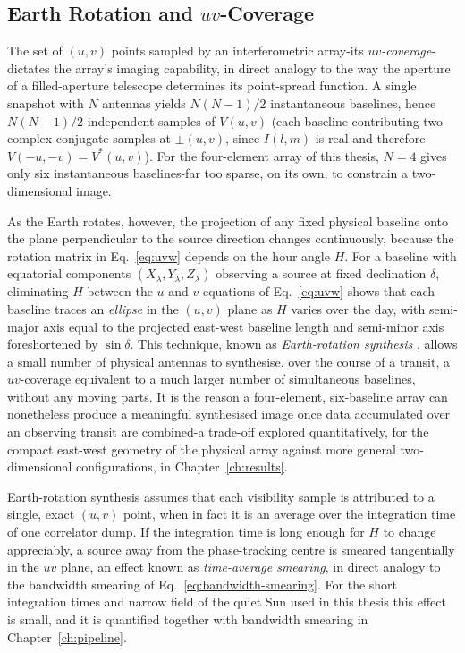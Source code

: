 \subsection{Earth Rotation and \texorpdfstring{$uv$}{uv}-Coverage}
\label{subsec:earth-rotation-uv}
The set of $(u,v)$ points sampled by an interferometric array-its
\emph{$uv$-coverage}-dictates the array's imaging capability, in direct
analogy to the way the aperture of a filled-aperture telescope determines its
point-spread function. A single snapshot with $N$ antennas yields $N(N-1)/2$
instantaneous baselines, hence $N(N-1)/2$ independent samples of $V(u,v)$
(each baseline contributing two complex-conjugate samples at $\pm(u,v)$, since
$I(l,m)$ is real and therefore $V(-u,-v)=V^{*}(u,v)$). For the four-element
array of this thesis, $N=4$ gives only six instantaneous baselines-far too
sparse, on its own, to constrain a two-dimensional image.

As the Earth rotates, however, the projection of any fixed physical baseline
onto the plane perpendicular to the source direction changes continuously,
because the rotation matrix in Eq.~\eqref{eq:uvw} depends on the hour angle
$H$. For a baseline with equatorial components $(X_\lambda,Y_\lambda,Z_\lambda)$
observing a source at fixed declination $\delta$, eliminating $H$ between the
$u$ and $v$ equations of Eq.~\eqref{eq:uvw} shows that each baseline traces an
\emph{ellipse} in the $(u,v)$ plane as $H$ varies over the day, with
semi-major axis equal to the projected east-west baseline length and
semi-minor axis foreshortened by $\sin\delta$. This technique, known as
\emph{Earth-rotation synthesis} \citep{taylor1999synthesis}, allows a small
number of physical antennas to synthesise, over the course of a transit, a
$uv$-coverage equivalent to a much larger number of simultaneous baselines,
without any moving parts. It is the reason a four-element, six-baseline array
can nonetheless produce a meaningful synthesised image once data accumulated
over an observing transit are combined-a trade-off explored quantitatively,
for the compact east-west geometry of the physical array against more general
two-dimensional configurations, in Chapter~\ref{ch:results}.

Earth-rotation synthesis assumes that each visibility sample is attributed to
a single, exact $(u,v)$ point, when in fact it is an average over the
integration time of one correlator dump. If the integration time is long
enough for $H$ to change appreciably, a source away from the phase-tracking
centre is smeared tangentially in the $uv$ plane, an effect known as
\emph{time-average smearing}, in direct analogy to the bandwidth smearing of
Eq.~\eqref{eq:bandwidth-smearing}. For the short integration times and narrow
field of the quiet Sun used in this thesis this effect is small, and it is
quantified together with bandwidth smearing in Chapter~\ref{ch:pipeline}.

